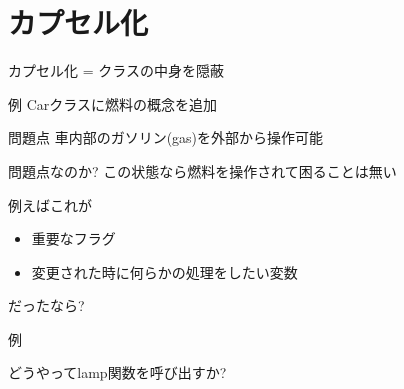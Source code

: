 \documentclass[12pt, xetex, xcolor=pdftex, dvipsnames]{beamer}
\begin{document}
\section{カプセル化}
{
    \begin{frame}{カプセル化 = クラスの中身を隠蔽}
    \end{frame}
}
\begin{frame}[fragile]{例}
    Carクラスに燃料の概念を追加
    

    \pause
    \begin{block}{問題点}
        車内部のガソリン(gas)を外部から操作可能
    \end{block}
\end{frame}
\begin{frame}{問題点なのか?}
    この状態なら燃料を操作されて困ることは無い

    例えばこれが
    \begin{itemize}
        \item 重要なフラグ
        \item 変更された時に何らかの処理をしたい変数
    \end{itemize}
    だったなら?
\end{frame}
\begin{frame}[fragile]{例}
    
    どうやってlamp関数を呼び出すか?
\end{frame}
\end{document}
